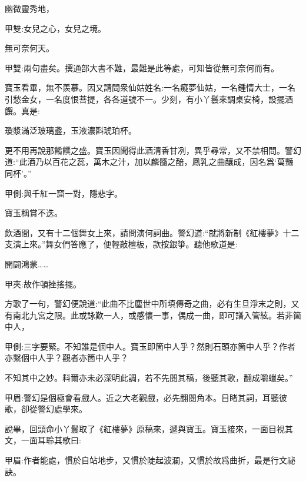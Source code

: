 \begin{poem}
    \begin{pl}幽微靈秀地，\end{pl}\begin{note}甲雙:女兒之心，女兒之境。\end{note}

    \begin{pl}無可奈何天。\end{pl}\begin{note}甲雙:兩句盡矣。撰通部大書不難，最難是此等處，可知皆從無可奈何而有。\end{note}
\end{poem}


\begin{parag}
    寶玉看畢，無不羨慕。因又請問衆仙姑姓名:一名癡夢仙姑，一名鍾情大士，一名引愁金女，一名度恨菩提，各各道號不一。少刻，有小丫鬟來調桌安椅，設擺酒饌。真是:
\end{parag}


\begin{poem}
    \begin{pl} 瓊漿滿泛玻璃盞，玉液濃斟琥珀杯。\end{pl}
\end{poem}


\begin{parag}
    更不用再說那餚饌之盛。寶玉因聞得此酒清香甘冽，異乎尋常，又不禁相問。警幻道:“此酒乃以百花之蕊，萬木之汁，加以麟髓之醅，鳳乳之曲釀成，因名爲‘萬豔同杯’。”\begin{note}甲側:與千紅一窟一對，隱悲字。\end{note}寶玉稱賞不迭。
\end{parag}


\begin{parag}
    飲酒間，又有十二個舞女上來，請問演何詞曲。警幻道:“就將新制《紅樓夢》十二支演上來。”舞女們答應了，便輕敲檀板，款按銀箏。聽他歌道是:
\end{parag}


\begin{qute2sp}

    開闢鴻蒙……\begin{note}甲夾:故作頓挫搖擺。\end{note}
\end{qute2sp}


\begin{parag}
    方歌了一句，警幻便說道:“此曲不比塵世中所填傳奇之曲，必有生旦淨末之則，又有南北九宮之限。此或詠歎一人，或感懷一事，偶成一曲，即可譜入管絃。若非箇中人，\begin{note}甲側:三字要緊。不知誰是個中人。寶玉即箇中人乎？然則石頭亦箇中人乎？作者亦繫個中人乎？觀者亦箇中人乎？\end{note}不知其中之妙。料爾亦未必深明此調，若不先閱其稿，後聽其歌，翻成嚼蠟矣。”\begin{note}甲眉:警幻是個極會看戲人。近之大老觀戲，必先翻閱角本。目睹其詞，耳聽彼歌，卻從警幻處學來。\end{note}說畢，回頭命小丫鬟取了《紅樓夢》原稿來，遞與寶玉。寶玉接來，一面目視其文，一面耳聆其歌曰:\begin{note}甲眉:作者能處，慣於自站地步，又慣於陡起波瀾，又慣於故爲曲折，最是行文祕訣。\end{note}
\end{parag}


